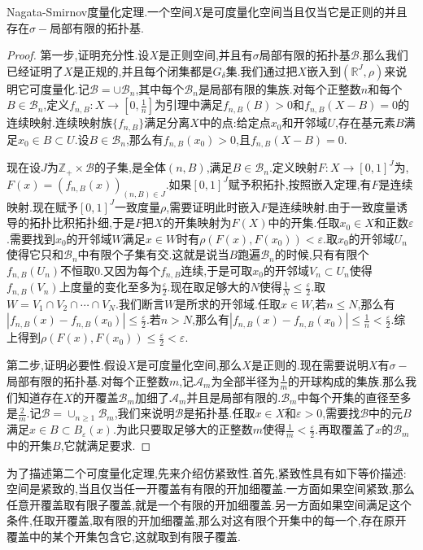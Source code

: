 Nagata-Smirnov度量化定理.一个空间$X$是可度量化空间当且仅当它是正则的并且存在$\sigma-$局部有限的拓扑基.
\begin{proof}
	
	第一步,证明充分性.设$X$是正则空间,并且有$\sigma$局部有限的拓扑基$\mathscr{B}$.那么我们已经证明了$X$是正规的,并且每个闭集都是$G_{\delta}$集.我们通过把$X$嵌入到$(\mathbb{R}^J,\rho)$来说明它可度量化.记$\mathscr{B}=\cup\mathscr{B}_n$,其中每个$\mathscr{B}_n$是局部有限的集族.对每个正整数$n$和每个$B\in\mathscr{B}_n$,定义$f_{n,B}:X\to[0,\frac{1}{n}]$为引理中满足$f_{n,B}(B)>0$和$f_{n,B}(X-B)=0$的连续映射.连续映射族$\{f_{n,B}\}$满足分离$X$中的点:给定点$x_0$和开邻域$U$,存在基元素$B$满足$x_0\in B\subset U$.设$B\in\mathscr{B}_n$,那么有$f_{n,B}(x_0)>0$,且$f_{n,B}(X-B)=0$.
	
	现在设$J$为$\mathbb{Z}_+\times\mathscr{B}$的子集,是全体$(n,B)$,满足$B\in\mathscr{B}_n$.定义映射$F:X\to[0,1]^J$为,$F(x)=(f_{n,B}(x))_{(n,B)\in J}$.如果$[0,1]^J$赋予积拓扑,按照嵌入定理,有$F$是连续映射.现在赋予$[0,1]^J$一致度量$\rho$,需要证明此时嵌入$F$是连续映射.由于一致度量诱导的拓扑比积拓扑细,于是$F$把$X$的开集映射为$F(X)$中的开集.任取$x_0\in X$和正数$\varepsilon$.需要找到$x_0$的开邻域$W$满足$x\in W$时有$\rho(F(x),F(x_0))<\varepsilon$.取$x_0$的开邻域$U_n$使得它只和$\mathscr{B}_n$中有限个子集有交.这就是说当$B$跑遍$\mathscr{B}_n$的时候,只有有限个$f_{n,B}(U_n)$不恒取0.又因为每个$f_{n,B}$连续,于是可取$x_0$的开邻域$V_n\subset U_n$使得$f_{n,B}(V_n)$上度量的变化至多为$\frac{\varepsilon}{2}$.现在取足够大的$N$使得$\frac{1}{N}\le\frac{\varepsilon}{2}$.取$W=V_1\cap V_2\cap\cdots\cap V_N$.我们断言$W$是所求的开邻域.任取$x\in W$,若$n\le N$,那么有$|f_{n,B}(x)-f_{n,B}(x_0)|\le\frac{\varepsilon}{2}$.若$n>N$,那么有$|f_{n,B}(x)-f_{n,B}(x_0)|\le\frac{1}{n}<\frac{\varepsilon}{2}$.综上得到$\rho(F(x),F(x_0))\le\frac{\varepsilon}{2}<\varepsilon$.
	
	第二步,证明必要性.假设$X$是可度量化空间,那么$X$是正则的.现在需要说明$X$有$\sigma-$局部有限的拓扑基.对每个正整数$m$,记$\mathscr{A}_m$为全部半径为$\frac{1}{m}$的开球构成的集族.那么我们知道存在$X$的开覆盖$\mathscr{B}_m$加细了$\mathscr{A}_m$并且是局部有限的.$\mathscr{B}_m$中每个开集的直径至多是$\frac{2}{m}$.记$\mathscr{B}=\cup_{n\ge1}\mathscr{B}_m$,我们来说明$\mathscr{B}$是拓扑基.任取$x\in X$和$\varepsilon>0$,需要找$\mathscr{B}$中的元$B$满足$x\in B\subset B_{\varepsilon}(x)$.为此只要取足够大的正整数$m$使得$\frac{1}{m}<\frac{\varepsilon}{2}$.再取覆盖了$x$的$\mathscr{B}_m$中的开集$B$,它就满足要求.
\end{proof}

为了描述第二个可度量化定理,先来介绍仿紧致性.首先,紧致性具有如下等价描述:空间是紧致的,当且仅当任一开覆盖有有限的开加细覆盖.一方面如果空间紧致,那么任意开覆盖取有限子覆盖,就是一个有限的开加细覆盖.另一方面如果空间满足这个条件,任取开覆盖,取有限的开加细覆盖,那么对这有限个开集中的每一个,存在原开覆盖中的某个开集包含它,这就取到有限子覆盖.

